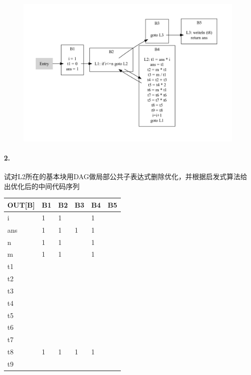 \documentclass[UTF8]{ctexart} %
\begin{document}
\begin{figure}[H]
    \centering
    \includegraphics[width=\textwidth]{assets/control-flow.pdf}
\end{figure}

\paragraph{2.} 试对L2所在的基本块用DAG做局部公共子表达式删除优化，并根据启发式算法给出优化后的中间代码序列

\begin{table}[H]
    \centering
    \begin{tabular}{|p{2cm}<{\centering}|p{1cm}<{\centering}|p{1cm}<{\centering}|p{1cm}<{\centering}|p{1cm}<{\centering}|p{1cm}<{\centering}|}
        \hline
        OUT[B] & B1 & B2 & B3 & B4 & B5 \\
        \hline
        i      & 1  & 1  &    & 1  &    \\
        \hline
        ans    & 1  & 1  & 1  & 1  &    \\
        \hline
        n      & 1  & 1  &    & 1  &    \\
        \hline
        m      & 1  & 1  &    & 1  &    \\
        \hline
        t1     &    &    &    &    &    \\
        \hline
        t2     &    &    &    &    &    \\
        \hline
        t3     &    &    &    &    &    \\
        \hline
        t4     &    &    &    &    &    \\
        \hline
        t5     &    &    &    &    &    \\
        \hline
        t6     &    &    &    &    &    \\
        \hline
        t7     &    &    &    &    &    \\
        \hline
        t8     & 1  & 1  & 1  & 1  &    \\
        \hline
        t9     &    &    &    &    &    \\
        \hline
    \end{tabular}
\end{table}
\end{document}

